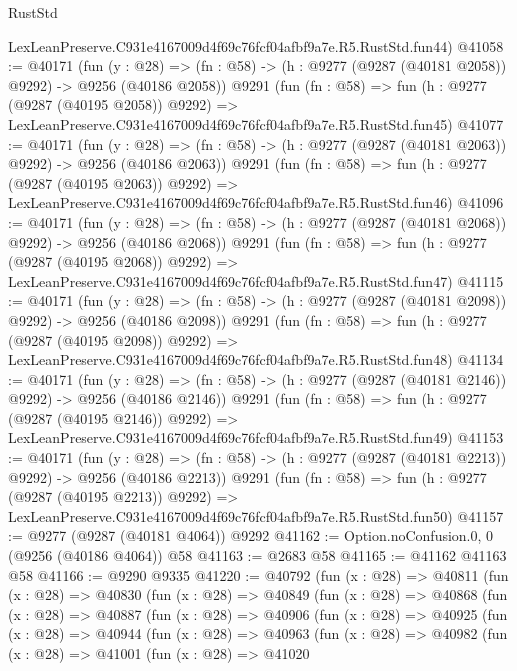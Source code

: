 \begin{lexlean}{RustStd}
\begin{coremodule}
    LexLeanPreserve.C931e4167009d4f69c76fcf04afbf9a7e.R5.RustStd.fun44)
@41058 := @40171
    (fun (y : @28) =>
    (fn : @58) -> (h : @9277 (@9287 (@40181 @2058)) @9292) -> @9256 (@40186 @2058))
    @9291
    (fun (fn : @58) =>
    fun (h : @9277 (@9287 (@40195 @2058)) @9292) =>
    LexLeanPreserve.C931e4167009d4f69c76fcf04afbf9a7e.R5.RustStd.fun45)
@41077 := @40171
    (fun (y : @28) =>
    (fn : @58) -> (h : @9277 (@9287 (@40181 @2063)) @9292) -> @9256 (@40186 @2063))
    @9291
    (fun (fn : @58) =>
    fun (h : @9277 (@9287 (@40195 @2063)) @9292) =>
    LexLeanPreserve.C931e4167009d4f69c76fcf04afbf9a7e.R5.RustStd.fun46)
@41096 := @40171
    (fun (y : @28) =>
    (fn : @58) -> (h : @9277 (@9287 (@40181 @2068)) @9292) -> @9256 (@40186 @2068))
    @9291
    (fun (fn : @58) =>
    fun (h : @9277 (@9287 (@40195 @2068)) @9292) =>
    LexLeanPreserve.C931e4167009d4f69c76fcf04afbf9a7e.R5.RustStd.fun47)
@41115 := @40171
    (fun (y : @28) =>
    (fn : @58) -> (h : @9277 (@9287 (@40181 @2098)) @9292) -> @9256 (@40186 @2098))
    @9291
    (fun (fn : @58) =>
    fun (h : @9277 (@9287 (@40195 @2098)) @9292) =>
    LexLeanPreserve.C931e4167009d4f69c76fcf04afbf9a7e.R5.RustStd.fun48)
@41134 := @40171
    (fun (y : @28) =>
    (fn : @58) -> (h : @9277 (@9287 (@40181 @2146)) @9292) -> @9256 (@40186 @2146))
    @9291
    (fun (fn : @58) =>
    fun (h : @9277 (@9287 (@40195 @2146)) @9292) =>
    LexLeanPreserve.C931e4167009d4f69c76fcf04afbf9a7e.R5.RustStd.fun49)
@41153 := @40171
    (fun (y : @28) =>
    (fn : @58) -> (h : @9277 (@9287 (@40181 @2213)) @9292) -> @9256 (@40186 @2213))
    @9291
    (fun (fn : @58) =>
    fun (h : @9277 (@9287 (@40195 @2213)) @9292) =>
    LexLeanPreserve.C931e4167009d4f69c76fcf04afbf9a7e.R5.RustStd.fun50)
@41157 := @9277 (@9287 (@40181 @4064)) @9292
@41162 := Option.noConfusion.{0, 0} (@9256 (@40186 @4064)) @58
@41163 := @2683 @58
@41165 := @41162 @41163 @58
@41166 := @9290 @9335
@41220 := @40792
    (fun (x : @28) =>
    @40811
      (fun (x : @28) =>
      @40830
        (fun (x : @28) =>
        @40849
          (fun (x : @28) =>
          @40868
            (fun (x : @28) =>
            @40887
              (fun (x : @28) =>
              @40906
                (fun (x : @28) =>
                @40925
                  (fun (x : @28) =>
                  @40944
                    (fun (x : @28) =>
                    @40963
                      (fun (x : @28) =>
                      @40982
                        (fun (x : @28) =>
                        @41001
                          (fun (x : @28) =>
                          @41020

\end{coremodule}
\end{lexlean}
